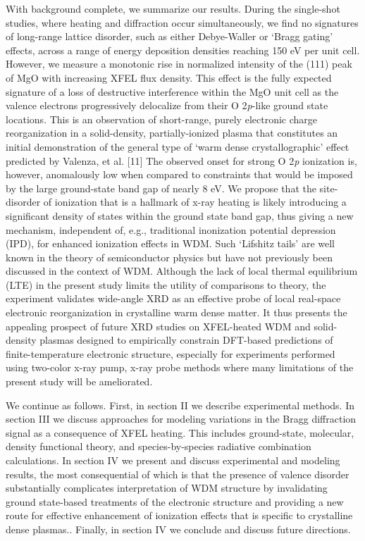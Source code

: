 With background complete, we summarize our results. During the
single-shot studies, where heating and diffraction occur simultaneously,
we find no signatures of long-range lattice disorder, such as either
Debye-Waller or `Bragg gating' effects, across a range of energy
deposition densities reaching 150 eV per unit cell. However, we measure
a monotonic rise in normalized intensity of the (111) peak of MgO with
increasing XFEL flux density. This effect is the fully expected
signature of a loss of destructive interference within the MgO unit cell
as the valence electrons progressively delocalize from their O
2\emph{p}-like ground state locations. This is an observation of
short-range, purely electronic charge reorganization in a solid-density,
partially-ionized plasma that constitutes an initial demonstration of
the general type of `warm dense crystallographic' effect predicted by
Valenza, et al. {[}11{]} The observed onset for strong O 2\emph{p}
ionization is, however, anomalously low when compared to constraints
that would be imposed by the large ground-state band gap of nearly 8 eV.
We propose that the site-disorder of ionization that is a hallmark of
x-ray heating is likely introducing a significant density of states
within the ground state band gap, thus giving a new mechanism,
independent of, e.g., traditional inonization potential depression
(IPD), for enhanced ionization effects in WDM. Such `Lifshitz tails' are
well known in the theory of semiconductor physics but have not
previously been discussed in the context of WDM. Although the lack of
local thermal equilibrium (LTE) in the present study limits the utility
of comparisons to theory, the experiment validates wide-angle XRD as an
effective probe of local real-space electronic reorganization in
crystalline warm dense matter. It thus presents the appealing prospect
of future XRD studies on XFEL-heated WDM and solid-density plasmas
designed to empirically constrain DFT-based predictions of
finite-temperature electronic structure, especially for experiments
performed using two-color x-ray pump, x-ray probe methods where many
limitations of the present study will be ameliorated.

We continue as follows. First, in section II we describe experimental
methods. In section III we discuss approaches for modeling variations in
the Bragg diffraction signal as a consequence of XFEL heating. This
includes ground-state, molecular, density functional theory, and
species-by-species radiative combination calculations. In section IV we
present and discuss experimental and modeling results, the most
consequential of which is that the presence of valence disorder
substantially complicates interpretation of WDM structure by
invalidating ground state-based treatments of the electronic structure
and providing a new route for effective enhancement of ionization
effects that is specific to crystalline dense plasmas.. Finally, in
section IV we conclude and discuss future directions.

